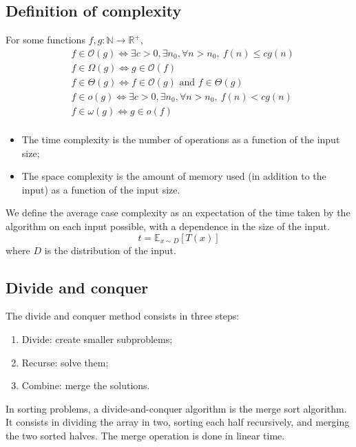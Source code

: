 \documentclass[12pt, openany]{report}
\newcommand{\R}{\mathbb{R}}
\theoremstyle{definition}
\begin{document}
\subsection{Definition of complexity}
For some functions $f,g:\mathbb{N} \to \R^+$, 
\begin{equation}
  	\begin{aligned}
		&f\in \mathcal{O}(g) \Longleftrightarrow \exists c>0, \exists n_0, \forall n>n_0,\ f(n)\le cg(n)\\
		&f\in \Omega(g)\Longleftrightarrow g\in \mathcal{O}(f)\\
		& f\in \Theta(g)\Longleftrightarrow f\in \mathcal{O}(g)\text{ and } f\in \Theta(g)\\
		&f\in o(g) \Longleftrightarrow \exists c>0, \exists n_0, \forall n>n_0,\ f(n)< cg(n)\\
		&f\in \omega(g)\Longleftrightarrow g\in o(f)\\
  	\end{aligned}
\end{equation}
\begin{itemize}
	\item The time complexity is the number of operations as a function of the input size;
	\item The space complexity is the amount of memory used (in addition to the input) as a function of the input size. 
\end{itemize}
We define the average case complexity as an expectation of the time taken by the algorithm on each input possible, with a dependence in the size of the input.
\begin{equation}
	t = \mathbb{E}_{x\sim D}[T(x)]
\end{equation}
where $D$ is the distribution of the input.\\
\subsection{Divide and conquer}
The divide and conquer method consists in three steps:
\begin{enumerate}
	\item Divide: create smaller subproblems;
	\item Recurse: solve them;
	\item Combine: merge the solutions.
\end{enumerate}
In sorting problems, a divide-and-conquer algorithm is the merge sort algorithm. It consists in dividing the array in two, sorting each half recursively, and merging the two sorted halves. The merge operation is done in linear time.\\
\end{document}
